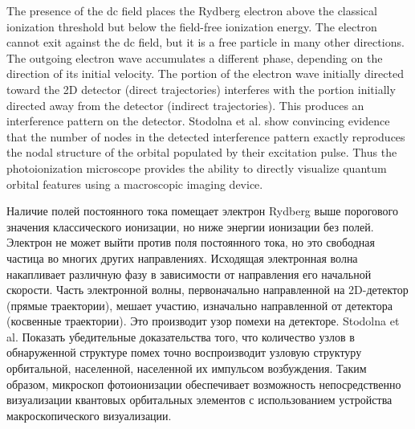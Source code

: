 The presence of the dc field places the Rydberg electron above the classical ionization threshold but below the field-free ionization energy. The electron cannot exit against the dc field, but it is a free particle in many other directions. The outgoing electron wave accumulates a different phase, depending on the direction of its initial velocity. The portion of the electron wave initially directed toward the 2D detector (direct trajectories) interferes with the portion initially directed away from the detector (indirect trajectories). This produces an interference pattern on the detector. Stodolna et al. show convincing evidence that the number of nodes in the detected interference pattern exactly reproduces the nodal structure of the orbital populated by their excitation pulse. Thus the photoionization microscope provides the ability to directly visualize quantum orbital features using a macroscopic imaging device.

Наличие полей постоянного тока помещает электрон Rydberg выше порогового значения классического ионизации, но ниже энергии ионизации без полей. Электрон не может выйти против поля постоянного тока, но это свободная частица во многих других направлениях. Исходящая электронная волна накапливает различную фазу в зависимости от направления его начальной скорости. Часть электронной волны, первоначально направленной на 2D-детектор (прямые траектории), мешает участию, изначально направленной от детектора (косвенные траектории). Это производит узор помехи на детекторе. Stodolna et al. Показать убедительные доказательства того, что количество узлов в обнаруженной структуре помех точно воспроизводит узловую структуру орбитальной, населенной, населенной их импульсом возбуждения. Таким образом, микроскоп фотоионизации обеспечивает возможность непосредственно визуализации квантовых орбитальных элементов с использованием устройства макроскопического визуализации.